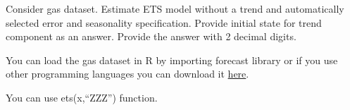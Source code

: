 
\begin{question}
Consider gas dataset. Estimate ETS model without a trend and automatically selected error and seasonality specification. Provide initial state for trend component as an answer. Provide the answer with 2 decimal digits.

You can load the gas dataset in R by importing forecast library or if you use other programming languages you can download it \href{https://github.com/vincentarelbundock/Rdatasets/blob/master/csv/forecast/gas.csv}{here}.
\end{question}

\begin{solution}
You can use ets(x,``ZZZ'') function.
\end{solution}

